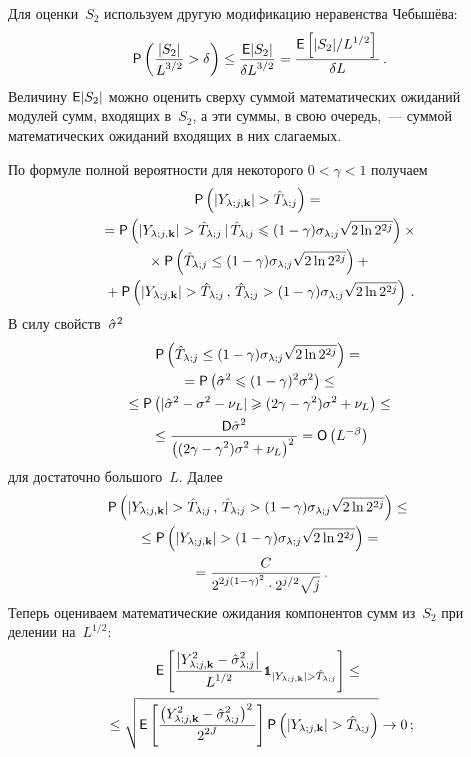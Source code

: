 \begin{multicols}{2}
Для оценки~$S_2$ используем другую модификацию неравенства Чебышёва:
\begin{equation*}
{\sf P}\left( \displaystyle\frac{\displaystyle |S_2|\mathstrut}{\displaystyle L^{3/2}\mathstrut} > \delta \right) \leq \displaystyle\frac{\displaystyle {\sf E}|S_2|\mathstrut}{\displaystyle \delta L^{3/2}\mathstrut} = 
\displaystyle\frac{\displaystyle {\sf E}\left[|S_2|/L^{1/2}\right]\mathstrut}{\displaystyle \delta L\mathstrut}\,.
\end{equation*}
Величину ${\sf E}|S_2|$ можно оценить сверху суммой математических ожиданий модулей сумм, входящих в~$S_2$, 
а эти суммы, в свою очередь,~--- суммой математических ожиданий входящих в них слагаемых.

По формуле полной вероятности для некоторого $0<\gamma<1$ получаем
\begin{multline*}
{\sf P}\left( |Y_{\lambda;j,\mathbf{k}}| > \hat T_{\lambda;j} \right)={}\\
{}={\sf P}\left( |Y_{\lambda;j,\mathbf{k}}| > \hat T_{\lambda;j} \,|\, \hat T_{\lambda;j} \leqslant (1-\gamma)\sigma_{\lambda;j}\sqrt{2\ln 2^{2j}} \right)\times{}\\
{}\times {\sf P}\left( \hat T_{\lambda;j} \leq (1-\gamma)\sigma_{\lambda;j}\sqrt{2\ln 2^{2j}} \right) + {}\\
{}+ {\sf P}\left( |Y_{\lambda;j,\mathbf{k}}| > \hat T_{\lambda;j} \,,\, \hat T_{\lambda;j} > (1-\gamma)\sigma_{\lambda;j}\sqrt{2\ln 2^{2j}} \right)\,.
\end{multline*}
В силу свойств~$\hat\sigma^2$
\begin{multline*}
{\sf P}\left( \hat T_{\lambda;j} \leq (1-\gamma)\sigma_{\lambda;j}\sqrt{2\ln 2^{2j}} \right)={}\\
{}={\sf P}\left(\hat\sigma^2\leqslant (1-\gamma)^2\sigma^2\right)\leq{}\\
{}\leq{\sf P}\left(|\hat\sigma^2-\sigma^2-\nu_L|\geqslant(2\gamma-\gamma^2)\sigma^2+\nu_L\right)\leq{}\\
{}\leq \displaystyle\frac{\displaystyle {\sf D}\hat\sigma^2\mathstrut}{\displaystyle \left((2\gamma-\gamma^2)\sigma^2+\nu_L\right)^2\mathstrut}=\textsf{O}\left(L^{-\beta}\right)
\end{multline*}
для достаточно большого~$L$. Далее
\begin{multline}
{\sf P}\left( |Y_{\lambda;j,\mathbf{k}}| > \hat T_{\lambda;j} \,,\, \hat T_{\lambda;j} > (1-\gamma)\sigma_{\lambda;j}\sqrt{2\ln 2^{2j}} \right) \leq{}\\
{}\leq {\sf P}\left( |Y_{\lambda;j,\mathbf{k}}| > (1-\gamma)\sigma_{\lambda;j}\sqrt{2\ln 2^{2j}} \right) = {}\\
{}=
\displaystyle\frac{\displaystyle  C \mathstrut}{\displaystyle  2^{2j(1-\gamma)^2}\cdot 2^{j/2}\sqrt{j} \mathstrut}\,.
\label{eq_prbSplitGammaTomo}
\end{multline}
Теперь оцениваем математические ожидания компонентов сумм из~$S_2$ при делении на~$L^{1/2}$:
\begin{multline*}
\e\left[\fr{\left| \Yljk^2 - \hslj \right|}{L^{1/2}}\indYjkghTj\right] \leq {}\\
{}\leq\sqrt{ \e\left[\fr{ \left(\Yljk^2 - \hslj\right)^2 }{2^{2J}}\right]  \p\left( |\Yljk| > \hTlj \right) } 
\rightarrow 0\,;
\end{multline*}


\end{multicols}
